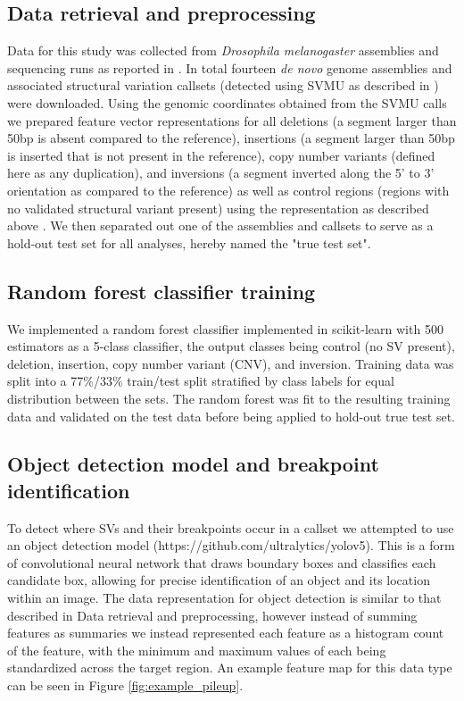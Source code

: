 

\subsection{Data retrieval and preprocessing}
Data for this study was collected from \textit{Drosophila melanogaster} assemblies and sequencing runs as reported in \cite{chakrabortyEvolutionGenomeStructure2021,chakrabortyHiddenGeneticVariation2018,chakrabortyStructuralVariantsExhibit2019}. In total fourteen \textit{de novo} genome assemblies and associated structural variation callsets (detected using SVMU as described in \cite{chakrabortyStructuralVariantsExhibit2019}) were downloaded. Using the genomic coordinates obtained from the SVMU calls we prepared feature vector representations for all deletions (a segment larger than 50bp is absent compared to the reference), insertions (a segment larger than 50bp is inserted that is not present in the reference), copy number variants (defined here as any duplication), and inversions (a segment inverted along the 5' to 3' orientation as compared to the reference) as well as control regions (regions with no validated structural variant present) using the representation as described above \cite{chakrabortyHiddenGeneticVariation2018}. We then separated out one of the assemblies and callsets to serve as a hold-out test set for all analyses, hereby named the "true test set".

\subsection{Random forest classifier training}

We implemented a random forest classifier implemented in scikit-learn with 500 estimators as a 5-class classifier, the output classes being control (no SV present), deletion, insertion, copy number variant (CNV), and inversion. Training data was split into a 77\%/33\% train/test split stratified by class labels for equal distribution between the sets. The random forest was fit to the resulting training data and validated on the test data before being applied to hold-out true test set.

\subsection{Object detection model and breakpoint identification}

To detect where SVs and their breakpoints occur in a callset we attempted to use an object detection model (https://github.com/ultralytics/yolov5). This is a form of convolutional neural network that draws boundary boxes and classifies each candidate box, allowing for precise identification of an object and its location within an image. The data representation for object detection is similar to that described in Data retrieval and preprocessing, however instead of summing features as summaries we instead represented each feature as a histogram count of the feature, with the minimum and maximum values of each being standardized across the target region. An example feature map for this data type can be seen in Figure \ref{fig:example_pileup}. 

